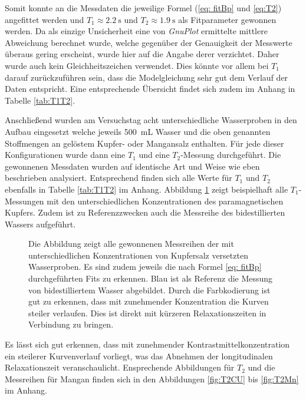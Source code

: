 Somit konnte an die Messdaten die jeweilige Formel (\eqref{eq: fitBp} und \eqref{eq:T2}) angefittet werden und $T_1 \approx \SI{2.2}{\second}$ und $T_2 \approx \SI{1.9}{\second}$ als Fitparameter gewonnen werden.
Da als einzige Unsicherheit eine von \textit{GnuPlot} ermittelte mittlere Abweichung berechnet wurde, welche gegenüber der Genauigkeit der Messwerte überaus gering erscheint, wurde hier auf die Angabe derer verzichtet.
Daher wurde auch kein Gleichheitszeichen verwendet. 
Dies könnte vor allem bei $T_1$ darauf zurückzuführen sein, dass die Modelgleichung sehr gut dem Verlauf der Daten entspricht.
Eine entsprechende Übersicht findet sich zudem im Anhang in Tabelle \ref{tab:T1T2}.

Anschließend wurden am Versuchstag acht unterschiedliche Wasserproben in den Aufbau eingesetzt welche jeweils \SI{500}{\milli \liter} Wasser und die oben genannten Stoffmengen an gelöstem Kupfer- oder Mangansalz enthalten.
Für jede dieser Konfigurationen wurde dann eine $T_1$ und eine $T_2$-Messung durchgeführt.
Die gewonnenen Messdaten wurden auf identische Art und Weise wie eben beschrieben analysiert.
Entsprechend finden sich alle Werte für $T_1$ und $T_2$ ebenfalls in Tabelle \ref{tab:T1T2} im Anhang.
Abbildung \ref{fig:T1CU} zeigt beispielhaft alle $T_1$-Messungen mit den unterschiedlichen Konzentrationen des paramagnetischen Kupfers.
Zudem ist zu Referenzzwecken auch die Messreihe des bidestillierten Wassers aufgeführt.

\begin{figure}[H]
    \centering
    
    \caption[Übersicht über alle Messreihen der mit Kupfersalz versetzten Wasserproben.]{Die Abbildung zeigt alle gewonnenen Messreihen der mit unterschiedlichen Konzentrationen von Kupfersalz versetzten Wasserproben.
    Es sind zudem jeweils die nach Formel \eqref{eq: fitBp} durchgeführten Fits zu erkennen.
    Blau ist als Referenz die Messung von bidestilliertem Wasser abgebildet.
    Durch die Farbkodierung ist gut zu erkennen, dass mit zunehmender Konzentration die Kurven steiler verlaufen.
    Dies ist direkt mit kürzeren Relaxationszeiten in Verbindung zu bringen.}
    \label{fig:T1CU}
\end{figure}

Es lässt sich gut erkennen, dass mit zunehmender Kontrastmittelkonzentration ein steilerer Kurvenverlauf vorliegt, was das Abnehmen der longitudinalen Relaxationszeit veranschaulicht.
Ensprechende Abbildungen für $T_2$ und die Messreihen für Mangan finden sich in den Abbildungen \ref{fig:T2CU} bis \ref{fig:T2Mn} im Anhang.

